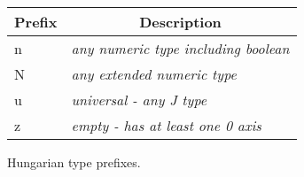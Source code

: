 \begin{figure}
{\begin{tabular}{|l|l|}
   \multicolumn{1}{|c|}{\rmfamily\textbf{Prefix\T\B}} &
   \multicolumn{1}{|c|}{\rmfamily\textbf{Description \T\B}} \\ \hline
 n\T\B & \textcolor{CodeComment}{\textsl{any numeric type including boolean}}  \\   
 N\T\B & \textcolor{CodeComment}{\textsl{any extended numeric type}}  \\
 u\T\B & \textcolor{CodeComment}{\textsl{universal - any J type}}  \\    
 z\T\B & \textcolor{CodeComment}{\textsl{empty - has at least one 0 axis}}  \\ \hline 
\end{tabular}
  }
  \caption[Hungarian Type Prefixes]{\rmfamily Hungarian type prefixes.}
  \label{fig:hungtype}
\end{figure}

